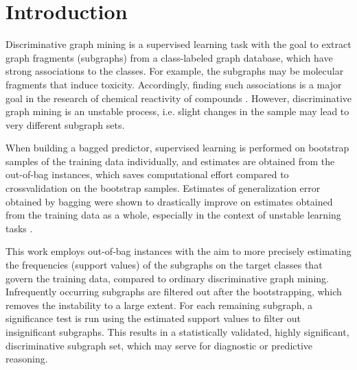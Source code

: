\documentclass{article}
\begin{document}
\section{Introduction}
Discriminative graph mining is a supervised learning task with the goal to
extract graph fragments (subgraphs) from a class-labeled graph database, which
have strong associations to the classes. For example, the subgraphs may be molecular fragments that
induce toxicity. Accordingly, finding such associations is a major goal in the
research of chemical reactivity of compounds \cite{kazius05derivation}. However, discriminative graph
mining is an unstable process, i.e. slight changes in the sample may lead to very
different subgraph sets. 

When building a bagged predictor, supervised learning is performed on bootstrap
samples of the training data individually, and estimates are obtained from the
out-of-bag instances, which saves computational effort compared to
crossvalidation on the bootstrap samples. Estimates of generalization error obtained by bagging were
shown to drastically improve on estimates obtained from the training data as a
whole, especially in the context of unstable learning tasks \cite{breiman96oob}. 

This work employs out-of-bag instances with the aim to more precisely
estimating the frequencies (support values) of the subgraphs on the target
classes that govern the training data, compared to ordinary discriminative
graph mining.  Infrequently occurring subgraphs are filtered out after the
bootstrapping, which removes the instability to a large extent.  For each
remaining subgraph, a significance test is run using the estimated support
values to filter out insignificant subgraphs.  This results in a statistically
validated, highly significant, discriminative subgraph set, which may serve for
diagnostic or predictive reasoning. 
\end{document}
